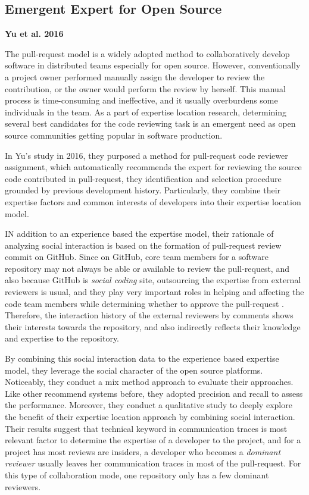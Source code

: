 \subsection{Emergent Expert for Open Source}

\textbf{Yu et al. 2016}

The pull-request model is a widely adopted method to collaboratively develop software in distributed teams especially for open source. However, conventionally a project owner performed manually assign the developer to review the contribution, or the owner would perform the review by herself. This manual process is time-consuming and ineffective, and it usually overburdens some individuals in the team. As a part of expertise location research, determining several best candidates for the code reviewing task is an emergent need as open source communities getting popular in software production.

In Yu's study in 2016, they purposed a method for pull-request code reviewer assignment, which automatically recommends the expert for reviewing the source code contributed in pull-request, they identification and selection procedure grounded by previous development history. Particularly, they combine their expertise factors and common interests of developers into their expertise location model.

IN addition to an experience based the expertise model, their rationale of analyzing social interaction is based on the formation of pull-request review commit on GitHub. Since on GitHub, core team members for a software repository may not always be able or available to review the pull-request, and also because GitHub is \textit{social coding} site, outsourcing the expertise from external reviewers is usual, and they play very important roles in helping and affecting the code team members while determining whether to approve the pull-request \cite{tsay2014let}. Therefore, the interaction history of the external reviewers by comments shows their interests towards the repository, and also indirectly reflects their knowledge and expertise to the repository.

By combining this social interaction data to the experience based expertise model, they leverage the social character of the open source platforms. Noticeably, they conduct a mix method approach to evaluate their approaches. Like other recommend systems before, they adopted precision and recall to assess the performance. Moreover, they conduct a qualitative study to deeply explore the benefit of their expertise location approach by combining social interaction. Their results suggest that technical keyword in communication traces is most relevant factor to determine the expertise of a developer to the project, and for a project has most reviews are insiders, a developer who becomes a \textit{dominant reviewer} usually leaves her communication traces in most of the pull-request. For this type of collaboration mode, one repository only has a few dominant reviewers.

